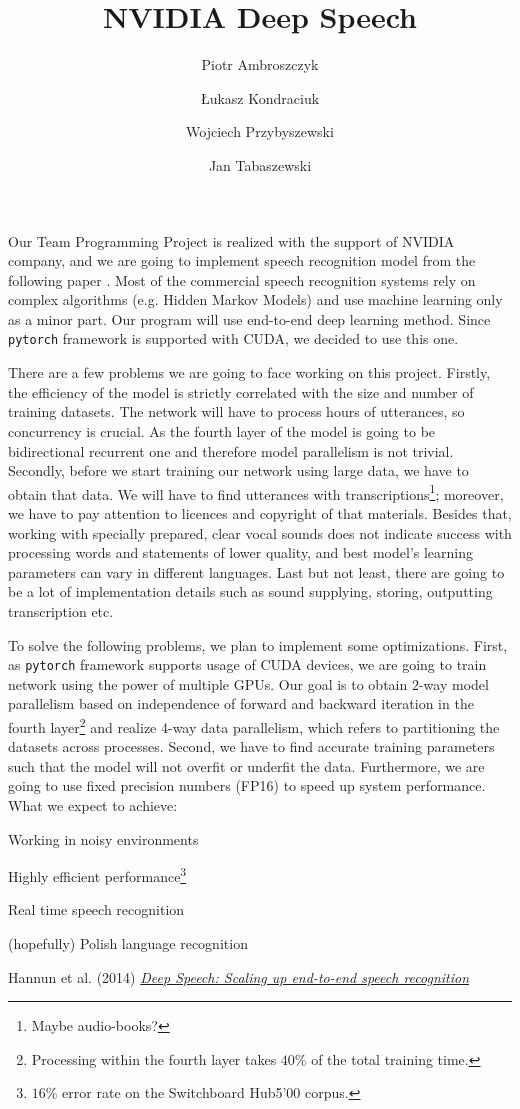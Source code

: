 \documentclass[11pt,a4paper]{article}
\title{NVIDIA Deep Speech}
\author{Piotr Ambroszczyk
\and Łukasz Kondraciuk
\and Wojciech Przybyszewski
\and Jan Tabaszewski}
\date{}
\begin{document}
\maketitle


Our Team Programming Project is realized with the support of NVIDIA company, and we are going to implement speech recognition model from the following paper \cite{paper}.
Most of the commercial speech recognition systems rely on complex algorithms (e.g. Hidden Markov Models) and use machine learning only as a minor part. Our program will use end-to-end deep learning method. Since \texttt{pytorch} framework is supported with CUDA, we decided to use this one.

There are a few problems we are going to face working on this project. Firstly, the efficiency of the model is strictly correlated with the size and number of training datasets. The network will have to process hours of utterances, so concurrency is crucial. As the fourth layer of the model is going to be bidirectional recurrent one and therefore model parallelism is not trivial. 
Secondly, before we start training our network using large data, we have to obtain that data. We will have to find utterances with transcriptions\footnote{ Maybe audio-books?}; moreover, we have to pay attention to licences and copyright of that materials.
Besides that, working with specially prepared, clear vocal sounds does not indicate success with processing words and statements of lower quality, and best model's learning parameters can vary in different languages.
Last but not least, there are going to be a lot of implementation details such as sound supplying, storing, outputting transcription etc.   

To solve the following problems, we plan to implement some optimizations. First, as \texttt{pytorch} framework supports usage of CUDA devices, we are going to train network using the power of multiple GPUs. Our goal is to obtain $2$-way model parallelism based on independence of forward and backward iteration in the fourth layer\footnote{ Processing within the fourth layer takes $40$\% of the total training time.} and realize $4$-way data parallelism, which refers to partitioning the datasets across processes. Second, we have to find accurate training parameters such that the model will not overfit or underfit the data. Furthermore, we are going to use fixed precision numbers (FP16) to speed up system performance.
\\

\noindent
What we expect to achieve:
\begin{itemize}
\item Working in noisy environments
\item Highly efficient performance\footnote{ $16$\% error rate on the Switchboard
Hub5’00 corpus.}
\item Real time speech recognition
{\color{gray} \item  (hopefully) Polish language recognition} 
\end{itemize}

\begin{thebibliography}{1}
   Hannun et al. (2014) \href{https://arxiv.org/pdf/1412.5567.pdf}{\em Deep Speech: Scaling up end-to-end speech recognition} 

  \end{thebibliography}
  
\end{document}
